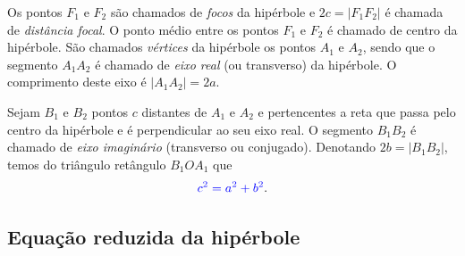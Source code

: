 Os pontos $F_1$ e $F_2$ são chamados de \emph{focos} da hipérbole e $2c = |F_1F_2|$ é chamada de \emph{distância focal}. O ponto médio entre os pontos $F_1$ e $F_2$ é chamado de centro da hipérbole. São chamados \emph{vértices} da hipérbole os pontos $A_1$ e $A_2$, sendo que o segmento $A_1A_2$ é chamado de \emph{eixo real} (ou transverso) da hipérbole. O comprimento deste eixo é $|A_1A_2|=2a$.

Sejam $B_1$ e $B_2$ pontos $c$ distantes de $A_1$ e $A_2$ e pertencentes a reta que passa pelo centro da hipérbole e é perpendicular ao seu eixo real. O segmento $B_1B_2$ é chamado de \emph{eixo imaginário} (transverso ou conjugado). Denotando $2b=|B_1B_2|$, temos do triângulo retângulo $B_1OA_1$ que
\begin{equation}
  {\color{blue}c^2 = a^2 + b^2}.
\end{equation}

\subsection{Equação reduzida da hipérbole}

